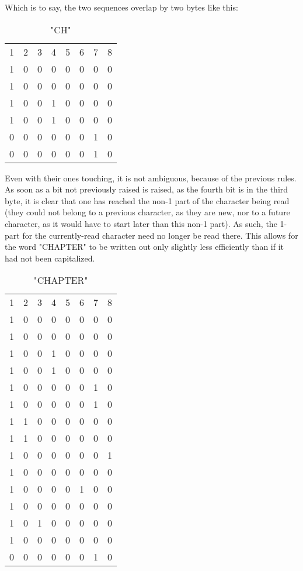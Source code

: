 \documentclass{article}
\begin{document}
Which is to say, the two sequences overlap by two bytes like this:
\begin{table}
    \centering
    \begin{tabular}{cccccccc}
        1 & 2 & 3 & 4 & 5 & 6 & 7 & 8\\
        1 & 0 & 0 & 0 & 0 & 0 & 0 & 0\\
        1 & 0 & 0 & 0 & 0 & 0 & 0 & 0\\
        1 & 0 & 0 & 1 & 0 & 0 & 0 & 0\\
        1 & 0 & 0 & 1 & 0 & 0 & 0 & 0\\
        0 & 0 & 0 & 0 & 0 & 0 & 1 & 0\\
        0 & 0 & 0 & 0 & 0 & 0 & 1 & 0\\
    \end{tabular}
    \caption{"CH"}
    \label{tab:my_label}
\end{table}
Even with their ones touching, it is not ambiguous, because of the previous rules.  As soon as a bit not previously raised is raised, as the fourth bit is in the third byte, it is clear that one has reached the non-1 part of the character being read (they could not belong to a previous character, as they are new, nor to a future character, as it would have to start later than this non-1 part).  As such, the 1-part for the currently-read character need no longer be read there.  This allows for the word "CHAPTER" to be written out only slightly less efficiently than if it had not been capitalized.
\begin{table}
    \centering
    \begin{tabular}{cccccccc}
        1 & 2 & 3 & 4 & 5 & 6 & 7 & 8\\
        1 & 0 & 0 & 0 & 0 & 0 & 0 & 0\\
        1 & 0 & 0 & 0 & 0 & 0 & 0 & 0\\
        1 & 0 & 0 & 1 & 0 & 0 & 0 & 0\\
        1 & 0 & 0 & 1 & 0 & 0 & 0 & 0\\
        1 & 0 & 0 & 0 & 0 & 0 & 1 & 0\\
        1 & 0 & 0 & 0 & 0 & 0 & 1 & 0\\
        1 & 1 & 0 & 0 & 0 & 0 & 0 & 0\\
        1 & 1 & 0 & 0 & 0 & 0 & 0 & 0\\
        1 & 0 & 0 & 0 & 0 & 0 & 0 & 1\\
        1 & 0 & 0 & 0 & 0 & 0 & 0 & 0\\
        1 & 0 & 0 & 0 & 0 & 1 & 0 & 0\\
        1 & 0 & 0 & 0 & 0 & 0 & 0 & 0\\
        1 & 0 & 1 & 0 & 0 & 0 & 0 & 0\\
        1 & 0 & 0 & 0 & 0 & 0 & 0 & 0\\
        0 & 0 & 0 & 0 & 0 & 0 & 1 & 0\\
    \end{tabular}
    \caption{"CHAPTER"}
    \label{tab:my_label}
\end{table}
\end{document}
